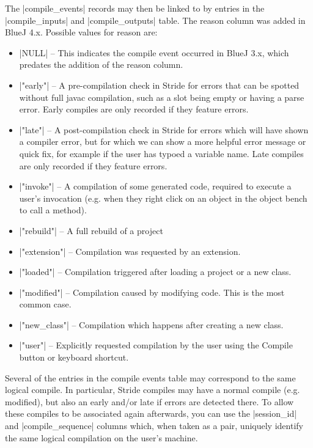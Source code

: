 \documentclass{report}
\begin{document}

The |compile_events| records may then be linked to by entries in the |compile_inputs| and
|compile_outputs| table.  The reason column was added in BlueJ 4.x.
Possible values for reason are:

\begin{itemize}
\item |NULL| -- This indicates the compile event occurred in BlueJ 3.x, which predates
the addition of the reason column.
\item |"early"| -- A pre-compilation check in Stride for errors that can be spotted without full javac
 compilation, such as a slot being empty or having a parse error.  Early compiles are only recorded if they feature errors.
\item |"late"| -- A post-compilation check in Stride for errors which will have shown
a compiler error, but for which we can show a more helpful error message or quick fix, for example if
 the user has typoed a variable name.  Late compiles are only recorded if they feature errors.
\item |"invoke"| -- A compilation of some generated code, required to execute a user's
invocation (e.g. when they right click on an object in the object bench to call a method).
\item |"rebuild"| -- A full rebuild of a project
\item |"extension"| -- Compilation was requested by an extension.
\item |"loaded"| -- Compilation triggered after loading a project or a new class.
\item |"modified"| -- Compilation caused by modifying code.  This is the most common case.
\item |"new_class"| -- Compilation which happens after creating a new class.
\item |"user"| -- Explicitly requested compilation by the user using the Compile button
or keyboard shortcut.
\end{itemize}

Several of the entries in the compile events table may correspond to the same logical compile.  In particular, Stride compiles may have a normal compile (e.g. modified), but also an early and/or late if errors are detected there.  To allow these compiles to be associated again afterwards, you can use the |session_id| and |compile_sequence| columns which, when taken as a pair, uniquely identify the same logical compilation on the user's machine.
\end{document}
